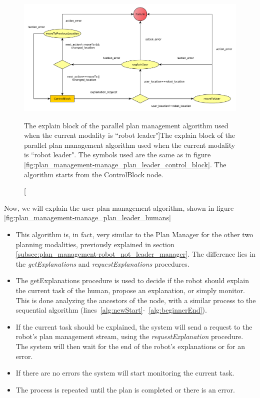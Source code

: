 \begin{figure}[ht!]
 \centering
 \includegraphics[scale=0.5]{img/plan_management/manage_plan_leader_explanation_block.pdf}
 \caption[The explain block of the parallel plan management algorithm used when the current modality is ``robot leader"]{The explain block of the parallel plan management algorithm used when the current modality is ``robot leader". The symbols used are the same as in figure \ref{fig:plan_management-manage_plan_leader_control_block}. The algorithm starts from the ControlBlock node.}
 \label{fig:plan_management-manage_plan_leader_explain_block}
 \end{figure}


Now, we will explain the user plan management algorithm, shown in figure \ref{fig:plan_management-manage_plan_leader_humans}
\begin{itemize}
\item This algorithm is, in fact, very similar to the Plan Manager for the other two planning modalities, previously explained in section \ref{subsec:plan_management-robot_not_leader_manager}. The difference lies in the \textit{getExplanations} and \textit{requestExplanations} procedures.
\item The getExplanations procedure is used to decide if the robot should explain the current task of the human, propose an explanation, or simply monitor. This is done analyzing the ancestors of the node, with a similar process to the sequential algorithm (lines~\ref{alg:newStart}-~\ref{alg:beginnerEnd}).
\item If the current task should be explained, the system will send a request to the robot's plan management stream, using the \textit{requestExplanation} procedure. The system will then wait for the end of the robot's explanations or for an error.
\item If there are no errors the system will start monitoring the current task.
\item The process is repeated until the plan is completed or there is an error.
\end{itemize}


